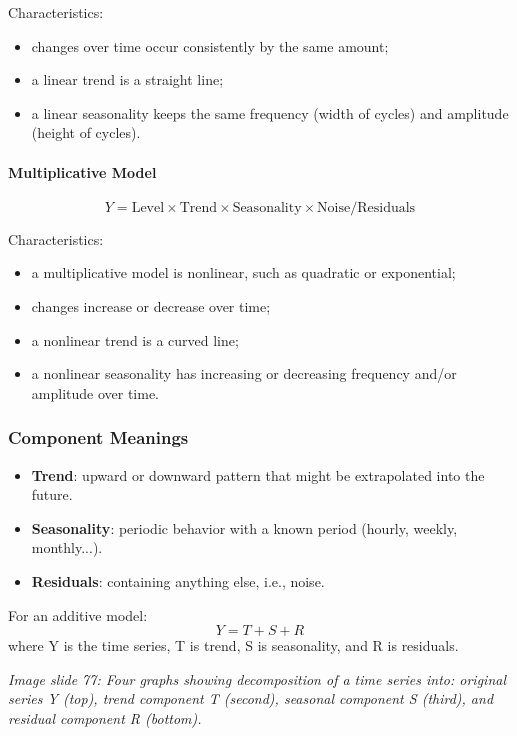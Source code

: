 Characteristics:
\begin{itemize}
    \item changes over time occur consistently by the same amount;
    \item a linear trend is a straight line;
    \item a linear seasonality keeps the same frequency (width of cycles) and amplitude (height of cycles).
\end{itemize}

\paragraph{Multiplicative Model}
\begin{equation}
Y = \text{Level} \times \text{Trend} \times \text{Seasonality} \times \text{Noise/Residuals}
\end{equation}

Characteristics:
\begin{itemize}
    \item a multiplicative model is nonlinear, such as quadratic or exponential;
    \item changes increase or decrease over time;
    \item a nonlinear trend is a curved line;
    \item a nonlinear seasonality has increasing or decreasing frequency and/or amplitude over time.
\end{itemize}

\subsubsection{Component Meanings}

\begin{itemize}
    \item \textbf{Trend}: upward or downward pattern that might be extrapolated into the future.
    \item \textbf{Seasonality}: periodic behavior with a known period (hourly, weekly, monthly...).
    \item \textbf{Residuals}: containing anything else, i.e., noise.
\end{itemize}

For an additive model:
\begin{equation}
Y = T + S + R
\end{equation}
where Y is the time series, T is trend, S is seasonality, and R is residuals.

\textit{Image slide 77: Four graphs showing decomposition of a time series into: original series Y (top), trend component T (second), seasonal component S (third), and residual component R (bottom).}

